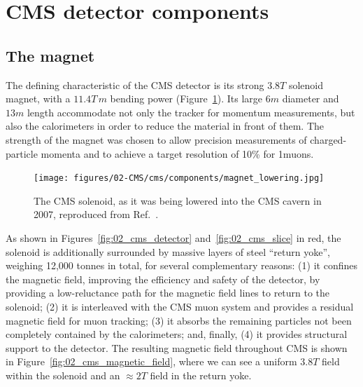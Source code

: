\section{CMS detector components}
\label{sec:02_cms_detectors}

\subsection{The magnet}
\label{sec:02_cms_magnet}

The defining characteristic of the CMS detector is its strong $3.8\unit{T}$ solenoid magnet, with a $11.4 \unit{T\,m}$ bending power (Figure~\ref{fig:02_cms_magnet}).
Its large $6\unit{m}$ diameter and $13\unit{m}$ length accommodate not only the tracker for momentum measurements, but also the calorimeters in order to reduce the material in front of them.
The strength of the magnet was chosen to allow precision measurements of charged-particle momenta and to achieve a target \pt resolution of 10\% for 1\TeV muons.

\begin{figure}[ht]
    \centering
    \texttt{[image: figures/02-CMS/cms/components/magnet\_lowering.jpg]}
    \caption{The CMS solenoid, as it was being lowered into the CMS cavern in 2007, reproduced from Ref.~\cite{Maximilien:1020310}.}
    \label{fig:02_cms_magnet}
\end{figure}

As shown in Figures~\ref{fig:02_cms_detector} and~\ref{fig:02_cms_slice} in red, the solenoid is additionally surrounded by massive layers of steel ``return yoke'', weighing 12,000 tonnes in total, for several complementary reasons:
(1) it confines the magnetic field, improving the efficiency and safety of the detector, by providing a low-reluctance path for the magnetic field lines to return to the solenoid;
(2) it is interleaved with the CMS muon system and provides a residual magnetic field for muon tracking;
(3) it absorbs the remaining particles not been completely contained by the calorimeters;
and, finally, (4) it provides structural support to the detector.
The resulting magnetic field throughout CMS is shown in Figure~\ref{fig:02_cms_magnetic_field}, where we can see a uniform $3.8\unit{T}$ field within the solenoid and an $\approx 2\unit{T}$ field in the return yoke.

